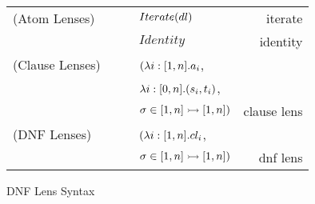 \begin{figure}
\begin{tabular}{l@{\ }l@{\ }c@{\ }l@{\ }r}

(Atom Lenses) &\AtomLens{} & \GEq{} & $Iterate(dl)$ & iterate\\
& & & \GBar{} $Identity$ & identity\\
(Clause Lenses) &\ClauseLens{} & \GEq{} &
$(\lambda i:[1,n].a_i$,\\
& & & $\lambda i:[0,n].(s_i,t_i)$,\\
& & & $\sigma \in [1,n] \rightarrowtail [1,n])$ & clause lens\\
(DNF Lenses)& \DNFLens{} & \GEq{} & $(\lambda i:[1,n].cl_i$,\\
& & & $\sigma \in [1,n] \rightarrowtail [1,n])$ & dnf lens\\
\end{tabular}
\caption{DNF Lens Syntax}
\label{fig:dnf-lens-syntax}
\end{figure}
